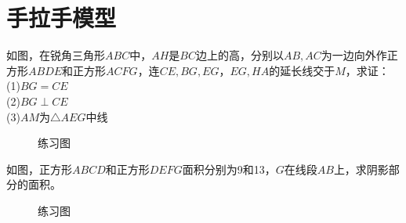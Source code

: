\section{手拉手模型}
\begin{example}
    如图，在锐角三角形$ABC$中，$AH$是$BC$边上的高，分别以$AB,AC$为一边向外作正方形$ABDE$和正方形$ACFG$，连$CE,BG,EG$，$EG,HA$的延长线交于$M$，求证：\\
    (1)$BG=CE$ \\
    (2)$BG\perp CE$ \\
    (3)$AM$为$\triangle AEG$中线 \\
\end{example}
\begin{figure}[H]
    \centering
    \resizebox{4cm}{!}{}
    \caption{练习图}
\end{figure}
\begin{problem}
如图，正方形$ABCD$和正方形$DEFG$面积分别为9和13，$G$在线段$AB$上，求阴影部分的面积。
\end{problem}
\begin{figure}[H]
    \centering
    \resizebox{4cm}{!}{}
    \caption{练习图}
\end{figure}
\clearpage
